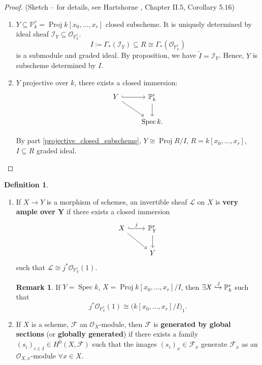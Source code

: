 \documentclass[12pt]{article}
\DeclareMathOperator{\Spec}{Spec}
\DeclareMathOperator{\Proj}{Proj}
\theoremstyle{definition}
\newtheorem*{definition}{Definition}
\newtheorem*{remark}{Remark}
\theoremstyle{remark}
\begin{document}
\begin{proof}
(Sketch -- for details, see Hartshorne \cite{hartshorne2013algebraic}, Chapter II.5, Corollary 5.16)

\begin{enumerate}[label=\arabic*)]
\item $Y\subseteq\mathbb{P}_k^r=\Proj k[x_0,\ldots,x_r]$ closed subscheme. It is uniquely determined by ideal sheaf $\mathcal{I}_Y\subseteq\mathcal{O}_{\mathbb{P}_k^r}$.
\[I\coloneqq\Gamma_*(\mathcal{I}_Y)\subseteq R\cong\Gamma_*(\mathcal{O}_{\mathbb{P}_k^r})\]
is a submodule and graded ideal. By proposition, we have $\widetilde{I}=\mathcal{I}_Y$. Hence, $Y$ is subscheme determined by $I$.

\item $Y$ projective over $k$, there exists a closed immersion:
\[
\begin{tikzcd}
Y\arrow[r,hook]\arrow[rd]&\mathbb{P}_k^r\arrow[d]\\
&\Spec k.
\end{tikzcd}
\]

By part \ref{projective_closed_subscheme}, $Y\cong\Proj R/I$, $R=k[x_0,\ldots,x_r]$, $I\subseteq R$ graded ideal.
\end{enumerate}
\end{proof}

\begin{definition}
\begin{enumerate}[label=\arabic*)]
\item If $X\rightarrow Y$ is a morphism of schemes, an invertible sheaf $\mathcal{L}$ on $X$ is \textbf{very ample over $\boldsymbol{Y}$} if there exists a closed immersion
\[
\begin{tikzcd}
X\arrow[r,hook,"j"]\arrow[rd]&\mathbb{P}_Y^r\arrow[d]\\
&Y
\end{tikzcd}
\]
such that $\mathcal{L}\cong j^*\mathcal{O}_{\mathbb{P}_Y^r}(1)$.

\begin{remark}
If $Y=\Spec k$, $X=\Proj k[x_0,\ldots,x_r]/I$, then $\exists X\xhookrightarrow{j}\mathbb{P}_k^r$ such that
\[j^*\mathcal{O}_{\mathbb{P}_k^r}(1)\cong\big(k[x_0,\ldots,x_r]/I\big)_1.\]
\end{remark}

\item If $X$ is a scheme, $\mathcal{F}$ an $\mathcal{O}_X$-module, then $\mathcal{F}$ is \textbf{generated by global sections} (or \textbf{globally generated}) if there exists a family $(s_i)_{i\in I}\in H^0(X,\mathcal{F})$ such that the images $(s_i)_x\in\mathcal{F}_x$ generate $\mathcal{F}_x$ as an $\mathcal{O}_{X,x}$-module $\forall x\in X$.
\end{enumerate}
\end{definition}
\end{document}
